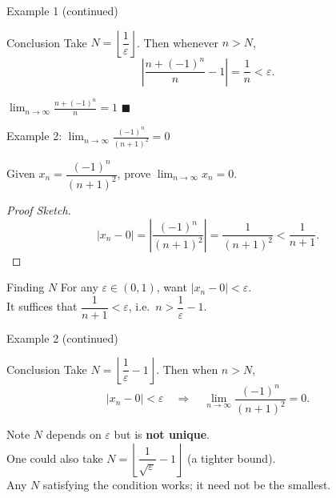 \documentclass[aspectratio=169,10pt]{beamer}
\begin{document}
\begin{frame}{Example 1 (continued)}
  \begin{block}{Conclusion}
    Take $N = \left\lfloor\dfrac{1}{\varepsilon}\right\rfloor$.
    Then whenever $n > N$,
    \[
      \left|\frac{n+(-1)^n}{n}-1\right| = \frac{1}{n} < \varepsilon.
    \]
  \end{block}
  \pause
  \begin{center}
    \Large$\displaystyle\lim_{n\to\infty}\frac{n+(-1)^n}{n}=1$ \hfill$\blacksquare$
  \end{center}
\end{frame}

\begin{frame}{Example 2: $\displaystyle\lim_{n\to\infty}\frac{(-1)^n}{(n+1)^2}=0$}
  \begin{example}
    Given $x_n = \dfrac{(-1)^n}{(n+1)^2}$, prove $\displaystyle\lim_{n\to\infty}x_n = 0$.
  \end{example}
  \pause
  \begin{proof}[Proof Sketch]
    \[
      |x_n - 0| = \left|\frac{(-1)^n}{(n+1)^2}\right|
                = \frac{1}{(n+1)^2} < \frac{1}{n+1}.
    \]
  \end{proof}
  \pause
  \begin{block}{Finding $N$}
    For any $\varepsilon\in(0,1)$, want $|x_n-0|<\varepsilon$.\\
    It suffices that $\dfrac{1}{n+1}<\varepsilon$, i.e.\ $n > \dfrac{1}{\varepsilon}-1$.
  \end{block}
\end{frame}

\begin{frame}{Example 2 (continued)}
  \begin{block}{Conclusion}
    Take $N = \left\lfloor\dfrac{1}{\varepsilon}-1\right\rfloor$.
    Then when $n > N$,
    \[
      |x_n - 0| < \varepsilon \quad\Longrightarrow\quad
      \lim_{n\to\infty}\frac{(-1)^n}{(n+1)^2}=0.
    \]
  \end{block}
  \pause
  \begin{alertblock}{Note}
    $N$ depends on $\varepsilon$ but is \textbf{not unique}.\\
    One could also take $N = \left\lfloor\dfrac{1}{\sqrt{\varepsilon}}-1\right\rfloor$ (a tighter bound).\\
    Any $N$ satisfying the condition works; it need not be the smallest.
  \end{alertblock}
\end{frame}
\end{document}
